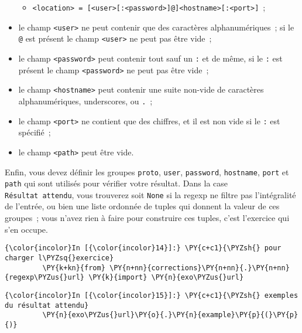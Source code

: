 \begin{itemize}
  \begin{itemize}
  \tightlist
  \item
    \texttt{\textless{}location\textgreater{}\ =\ {[}\textless{}user\textgreater{}{[}:\textless{}password\textgreater{}{]}@{]}\textless{}hostname\textgreater{}{[}:\textless{}port\textgreater{}{]}}~;
  \end{itemize}
\item
  le champ \texttt{\textless{}user\textgreater{}} ne peut contenir que
  des caractères alphanumériques~; si le \texttt{@} est présent le champ
  \texttt{\textless{}user\textgreater{}} ne peut pas être vide~;
\item
  le champ \texttt{\textless{}password\textgreater{}} peut contenir tout
  sauf un \texttt{:} et de même, si le \texttt{:} est présent le champ
  \texttt{\textless{}password\textgreater{}} ne peut pas être vide~;
\item
  le champ \texttt{\textless{}hostname\textgreater{}} peut contenir une
  suite non-vide de caractères alphanumériques, underscores, ou
  \texttt{.}~;
\item
  le champ \texttt{\textless{}port\textgreater{}} ne contient que des
  chiffres, et il est non vide si le \texttt{:} est spécifié~;
\item
  le champ \texttt{\textless{}path\textgreater{}} peut être vide.
\end{itemize}

Enfin, vous devez définir les groupes \texttt{proto}, \texttt{user},
\texttt{password}, \texttt{hostname}, \texttt{port} et \texttt{path} qui
sont utilisés pour vérifier votre résultat. Dans la case
\texttt{Résultat\ attendu}, vous trouverez soit \texttt{None} si la
regexp ne filtre pas l'intégralité de l'entrée, ou bien une liste
ordonnée de tuples qui donnent la valeur de ces groupes~; vous n'avez
rien à faire pour construire ces tuples, c'est l'exercice qui s'en
occupe.

    \begin{Verbatim}[commandchars=\\\{\},frame=single,framerule=0.3mm,rulecolor=\color{cellframecolor}]
{\color{incolor}In [{\color{incolor}14}]:} \PY{c+c1}{\PYZsh{} pour charger l\PYZsq{}exercice}
         \PY{k+kn}{from} \PY{n+nn}{corrections}\PY{n+nn}{.}\PY{n+nn}{regexp\PYZus{}url} \PY{k}{import} \PY{n}{exo\PYZus{}url}
\end{Verbatim}


    \begin{Verbatim}[commandchars=\\\{\},frame=single,framerule=0.3mm,rulecolor=\color{cellframecolor}]
{\color{incolor}In [{\color{incolor}15}]:} \PY{c+c1}{\PYZsh{} exemples du résultat attendu}
         \PY{n}{exo\PYZus{}url}\PY{o}{.}\PY{n}{example}\PY{p}{(}\PY{p}{)}
\end{Verbatim}


